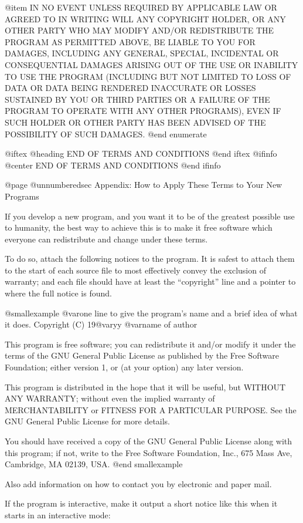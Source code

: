 @item
IN NO EVENT UNLESS REQUIRED BY APPLICABLE LAW OR AGREED TO IN WRITING WILL
ANY COPYRIGHT HOLDER, OR ANY OTHER PARTY WHO MAY MODIFY AND/OR
REDISTRIBUTE THE PROGRAM AS PERMITTED ABOVE, BE LIABLE TO YOU FOR DAMAGES,
INCLUDING ANY GENERAL, SPECIAL, INCIDENTAL OR CONSEQUENTIAL DAMAGES
ARISING OUT OF THE USE OR INABILITY TO USE THE PROGRAM (INCLUDING BUT NOT
LIMITED TO LOSS OF DATA OR DATA BEING RENDERED INACCURATE OR LOSSES
SUSTAINED BY YOU OR THIRD PARTIES OR A FAILURE OF THE PROGRAM TO OPERATE
WITH ANY OTHER PROGRAMS), EVEN IF SUCH HOLDER OR OTHER PARTY HAS BEEN
ADVISED OF THE POSSIBILITY OF SUCH DAMAGES.
@end enumerate

@iftex
@heading END OF TERMS AND CONDITIONS
@end iftex
@ifinfo
@center END OF TERMS AND CONDITIONS
@end ifinfo

@page
@unnumberedsec Appendix: How to Apply These Terms to Your New Programs

  If you develop a new program, and you want it to be of the greatest
possible use to humanity, the best way to achieve this is to make it
free software which everyone can redistribute and change under these
terms.

  To do so, attach the following notices to the program.  It is safest to
attach them to the start of each source file to most effectively convey
the exclusion of warranty; and each file should have at least the
``copyright'' line and a pointer to where the full notice is found.

@smallexample
@var{one line to give the program's name and a brief idea of what it does.}
Copyright (C) 19@var{yy}  @var{name of author}

This program is free software; you can redistribute it and/or modify
it under the terms of the GNU General Public License as published by
the Free Software Foundation; either version 1, or (at your option)
any later version.

This program is distributed in the hope that it will be useful,
but WITHOUT ANY WARRANTY; without even the implied warranty of
MERCHANTABILITY or FITNESS FOR A PARTICULAR PURPOSE.  See the
GNU General Public License for more details.

You should have received a copy of the GNU General Public License
along with this program; if not, write to the Free Software
Foundation, Inc., 675 Mass Ave, Cambridge, MA 02139, USA.
@end smallexample

Also add information on how to contact you by electronic and paper mail.

If the program is interactive, make it output a short notice like this
when it starts in an interactive mode:

